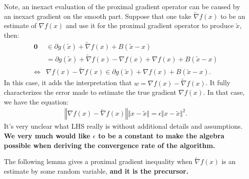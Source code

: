 \documentclass[12pt]{article}
\begin{document}
        Note, an inexact evaluation of the proximal gradient operator can be caused by an inexact gradient on the smooth part. 
        Suppose that one take $\tilde \nabla f(x)$ to be an estimate of $\nabla f(x)$ and use it for the proximal gradient operator to produce $\tilde x$, then: 
        \begin{align}
            \mathbf 0 
            &\in \partial g(\tilde x) + \tilde \nabla f(x) + B(\tilde x - x)
            \\
            &= 
            \partial g(\tilde x) + \tilde\nabla f(x) - \nabla f(x) 
            + \nabla f(x) + B(\tilde x - x)
            \\
            \iff &
            \nabla f(x) - \tilde \nabla f(x) \in 
            \partial g(\tilde x) 
            + \nabla f(x) + B(\tilde x - x).\label{eqn:stoch-grad-err-vec}
        \end{align}
        In this case, it adds the interpretation that $w = \nabla f(x) - \tilde \nabla f(x)$. 
        It fully characterizes the error made to estimate the true gradient $\nabla f(x)$. 
        In that case, we have the equation: 
        \begin{align*}
            \left\Vert \nabla f(x) - \tilde \nabla f(x) \right\Vert \Vert x - \tilde x\Vert
            = \epsilon \Vert x - \tilde x\Vert^2. 
        \end{align*}
        It's very unclear what LHS really is without additional details and assumptions. 
        \textbf{We very much would like $\epsilon$ to be a constant to make the algebra possible when deriving the convergence rate of the algorithm. }
        \par
        The following lemma gives a proximal gradient inequality when $\tilde \nabla f(x)$ is an estimate by some random variable, \textbf{and it is the precursor.} 
\end{document}

